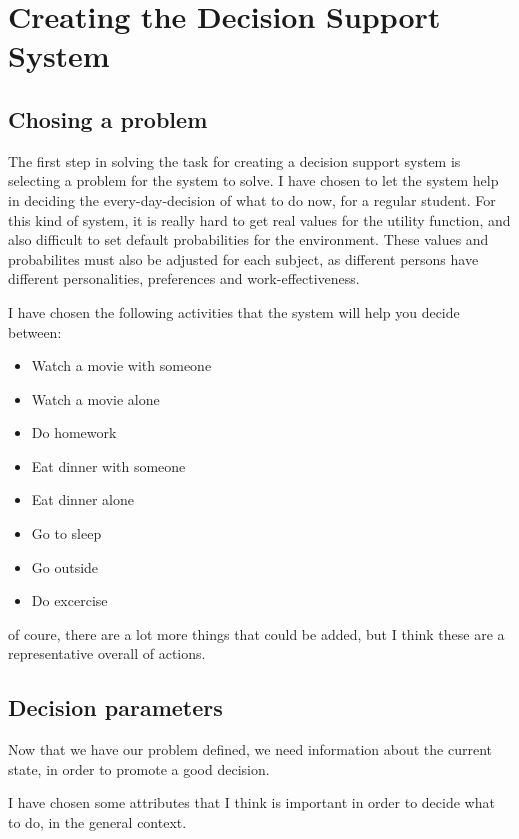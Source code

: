 \section{Creating the Decision Support System}
\subsection{Chosing a problem}
The first step in solving the task for creating a decision support system is
selecting a problem for the system to solve. I have chosen to let the system
help in deciding the every-day-decision of what to do now, for a
regular student. For this kind of system, it is really hard to get real values
for the utility function, and also difficult to set default probabilities for
the environment. These values and probabilites must also be adjusted for each
subject, as different persons have different personalities, preferences and
work-effectiveness.


I have chosen the following activities that the system will help you decide
between:
\begin{itemize}
  \item Watch a movie with someone
  \item Watch a movie alone
  \item Do homework
  \item Eat dinner with someone
  \item Eat dinner alone
  \item Go to sleep
  \item Go outside
  \item Do excercise
\end{itemize}
of coure, there are a lot more things that could be added, but I think these are
a representative overall of actions.

\subsection{Decision parameters}
Now that we have our problem defined, we need information about the current
state, in order to promote a good decision.

I have chosen some attributes that I think is important in order to decide what
to do, in the general context.

